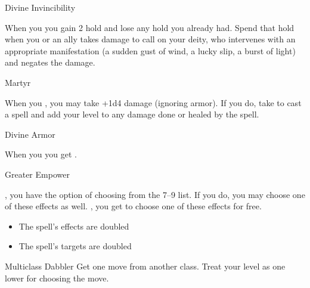 \documentclass[8pt]{extarticle}
\begin{document}
\begin{multicols}{2}
\begin{amove}{Divine Invincibility}

  When you  you gain 2 hold and lose any hold you
  already had. Spend that hold when you or an ally takes damage to
  call on your deity, who intervenes with an appropriate manifestation
  (a sudden gust of wind, a lucky slip, a burst of light) and negates
  the damage.
\end{amove}

\begin{amove}{Martyr}

When you , you may take
+1d4 damage (ignoring armor). If you do, take  to cast a
spell and add your level to any damage done or healed by the spell.
\end{amove}

\begin{amove}{Divine Armor}

  When you  you get .
\end{amove}

\begin{amove}{Greater Empower}

  , you have the option of choosing
  from the 7–9 list. If you do, you may choose one of these effects as
  well. \onMassiveSuccess, you get to choose one of these effects for
  free.

  \begin{itemize}
  \item The spell’s effects are doubled
  \item The spell’s targets are doubled
  \end{itemize}
\end{amove}


\begin{amove}{Multiclass Dabbler}
  Get one move from another class. Treat your level as one lower for
  choosing the move.
\end{amove}

\vfill\null
\end{multicols}
\clearpage


\
\end{document}
